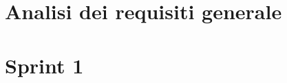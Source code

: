 \documentclass{llncs}           %
\newcommand{\labelsec}[1]{\label{sec:#1}}
\newcommand{\labelssec}[1]{\label{ssec:#1}}
\begin{document}
\section{Analisi dei requisiti generale}\labelsec{req_analysis}


\section{Sprint 1}\labelsec{sprint1}









\end{document}
